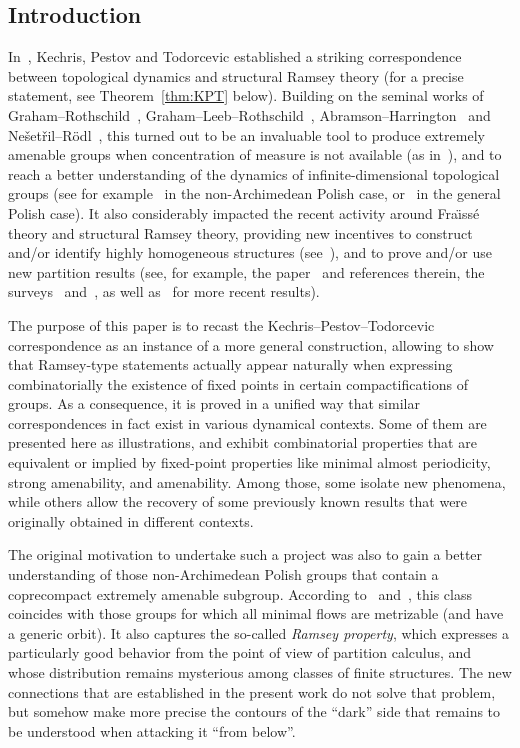 \documentclass[11pt]{article}
\theoremstyle{definition}
\numberwithin{equation}{section}
\numberwithin{figure}{section}
\numberwithin{table}{section}
\begin{document}
\subsection{Introduction}

In~\cite{KPT}, Kechris, Pestov and Todorcevic established a striking correspondence between topological dynamics and structural Ramsey theory (for a precise statement, see Theorem~\ref{thm:KPT} below). Building on the seminal works of Graham--Rothschild~\cite{GR}, Graham--Leeb--Rothschild~\cite{GLR1, GLR2}, Abramson--\linebreak Harrington~\cite{AH} and Ne\v set\v ril--R\"odl~\cite{NR1,NR2}, this turned out to be an invaluable tool to produce extremely amenable groups when concentration of measure is not available (as in~\cite{GM,Gl1, GP}), and to reach a better understanding of the dynamics of infinite-dimensional topological groups (see for example~\cite{AKL, Z1} in the non-Archimedean Polish case, or~\cite{MT, MNT, BYMT} in the general Polish case). It also considerably impacted the recent activity around Fra\"{\i}ss\'e theory and structural Ramsey theory, providing new incentives to construct and/or identify highly homogeneous structures (see~\cite{KuS, Ku, EFHKKL}), and to prove and/or use new partition results (see, for example, the paper~\cite{Sol6} and references therein, the surveys~\cite{Bod2} and~\cite{NVT6}, as well as~\cite{BaK2, BaK3, BLLM, HN, PS} for more recent results).

The purpose of this paper is to recast the Kechris--Pestov--Todorcevic correspondence as an instance of a more general construction, allowing to show that Ramsey-type statements actually appear naturally when expressing combinatorially the \hbox{existence} of fixed points in certain compactifications of groups. As a consequence, it is proved in a unified way that similar correspondences in fact exist in various dynamical contexts. Some of them are presented here as illustrations, and exhibit combinatorial properties that are equivalent or implied by fixed-point properties like minimal almost periodicity, strong amenability, and amenability. Among those, some isolate new phenomena, while others allow the recovery of some previously known results that were originally obtained in different contexts.

The original motivation to undertake such a project was also to gain a better understanding of those non-Archimedean Polish groups that contain a coprecompact extremely amenable subgroup. According to~\cite{MNT} and~\cite{Z2}, this class coincides with those groups for which all minimal flows are metrizable (and have a generic orbit). It also captures the so-called \emph{Ramsey property}, which expresses a particularly good behavior from the point of view of partition calculus, and whose distribution remains mysterious among classes of finite structures. The new connections that are established in the present work do not solve that problem, but somehow make more precise the contours of the ``dark'' side that remains to be understood when attacking it ``from below''.
\end{document}
